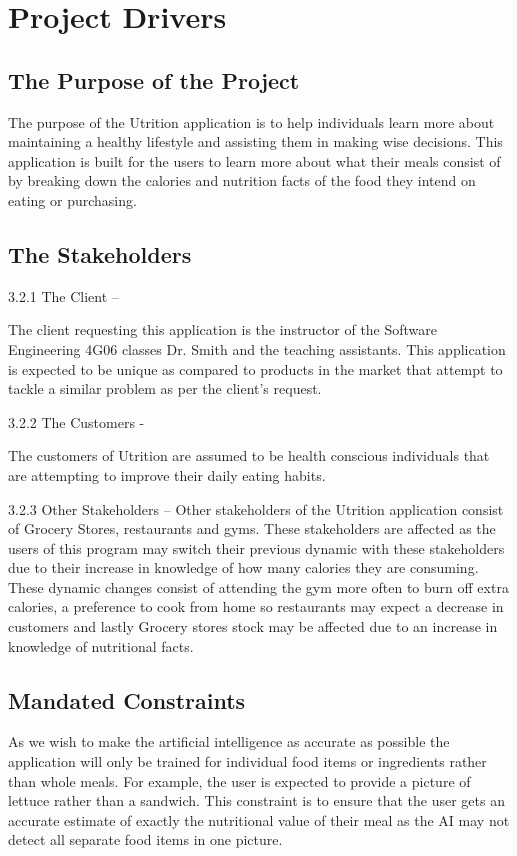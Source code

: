 \documentclass[12pt]{article}
\begin{document}
{\section{Project Drivers }

\subsection{The Purpose of the Project}

The purpose of the Utrition application is to help individuals learn more about maintaining a healthy lifestyle and assisting them in making wise decisions. This application is built for the users to learn more about what their meals consist of by breaking down the calories and nutrition facts of the food they intend on eating or purchasing.  

\subsection{The Stakeholders }
 
3.2.1 The Client –  

The client requesting this application is the instructor of the Software Engineering 4G06 classes Dr. Smith and the teaching assistants. This application is expected to be unique as compared to products in the market that attempt to tackle a similar problem as per the client's request.  

3.2.2 The Customers -  

The customers of Utrition are assumed to be health conscious individuals that are attempting to improve their daily eating habits. 

3.2.3 Other Stakeholders – Other stakeholders of the Utrition application consist of Grocery Stores, restaurants and gyms. These stakeholders are affected as the users of this program may switch their previous dynamic with these stakeholders due to their increase in knowledge of how many calories they are consuming. These dynamic changes consist of attending the gym more often to burn off extra calories, a preference to cook from home so restaurants may expect a decrease in customers and lastly Grocery stores stock may be affected due to an increase in knowledge of nutritional facts. 

\subsection{Mandated Constraints} 

As we wish to make the artificial intelligence as accurate as possible the application will only be trained for individual food items or ingredients rather than whole meals. For example, the user is expected to provide a picture of lettuce rather than a sandwich. This constraint is to ensure that the user gets an accurate estimate of exactly the nutritional value of their meal as the AI may not detect all separate food items in one picture. 

}
\end{document}
